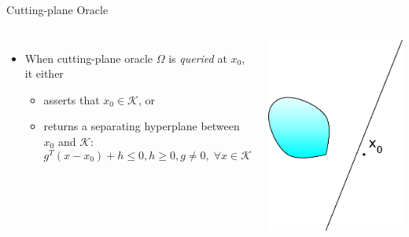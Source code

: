 \documentclass[10pt,ignorenonframetext,serif,onlymath]{beamer}
\providecommand{\tightlist}{%
  \setlength{\itemsep}{0pt}\setlength{\parskip}{0pt}}
\begin{document}
\begin{frame}{Cutting-plane Oracle}
\protect\hypertarget{sec:cutting-plane-oracle}{}

\begin{columns}


\begin{itemize}
\tightlist
\item
  When cutting-plane oracle \(\Omega\) is \emph{queried} at \(x_0\), it
  either

  \begin{itemize}
  \tightlist
  \item
    asserts that \(x_0 \in \mathcal{K}\), or
  \item
    returns a separating hyperplane between \(x_0\) and \(\mathcal{K}\):
    \[g^T (x - x_0) + h \leq 0, h \geq 0, g \neq 0, \;
          \forall x \in \mathcal{K}\]
  \end{itemize}
\end{itemize}


\includegraphics{ellipsoid.files/cut.pdf}

\end{columns}

\end{frame}
\end{document}
